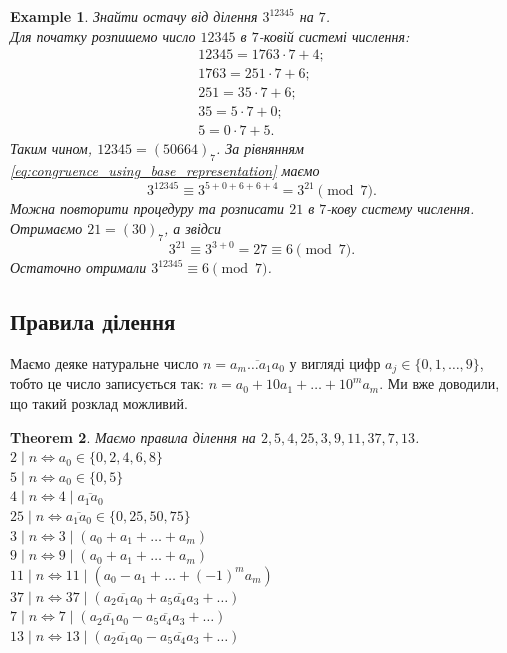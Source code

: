 \documentclass[a4paper, 10pt]{article}
\theoremstyle{theoremdd}
\newtheorem{theorem}{Theorem}[subsection]
\theoremstyle{theoremdd}
\theoremstyle{theoremdd}
\theoremstyle{theoremdd}
\newtheorem{example}[theorem]{Example}
\theoremstyle{theoremdd}
\theoremstyle{theoremdd}
\theoremstyle{theoremdd}
\theoremstyle{theoremdd}
\begin{document}
\begin{example}
Знайти остачу від ділення $3^{12345}$ на $7$.\\
Для початку розпишемо число $12345$ в $7$-ковій системі числення:
\begin{gather*}
12345 = 1763 \cdot 7 + 4;\\
1763 = 251 \cdot 7 + 6;\\
251 = 35 \cdot 7 + 6;\\
35 = 5 \cdot 7 + 0;\\
5 = 0 \cdot 7 + 5.
\end{gather*}
Таким чином, $12345 = (50664)_7$. За рівнянням \eqref{eq:congruence_using_base_representation} маємо
\[
3^{12345} \equiv 3^{5 + 0 + 6 + 6 + 4} = 3^{21} \pmod 7.
\]
Можна повторити процедуру та розписати $21$ в $7$-кову систему числення. Отримаємо $21 = (30)_7$, а звідси 
\[
3^{21} \equiv 3^{3+0} = 27 \equiv 6 \pmod 7.
\]
Остаточно отримали $3^{12345} \equiv 6 \pmod 7$.
\end{example}

\subsection{Правила ділення}
Маємо деяке натуральне число $n = \overline{a_m\dots a_1a_0}$ у вигляді цифр $a_j \in \{0,1,\dots,9\}$, тобто це число записується так: $n = a_0 + 10 a_1 + \dots + 10^m a_m$. Ми вже доводили, що такий розклад можливий.

\begin{theorem}
Маємо правила ділення на $2,5,4,25,3,9,11,37,7,13$.\\
$2 \mid n \iff a_0 \in \{0,2,4,6,8\}$\\
$5 \mid n \iff a_0 \in \{0,5\}$\\
$4 \mid n \iff 4 \mid \overline{a_1a_0}$\\
$25 \mid n \iff \overline{a_1a_0} \in \{0,25,50,75\}$\\
$3 \mid n \iff 3 \mid (a_0 + a_1 + \dots + a_m)$\\
$9 \mid n \iff 9 \mid (a_0 + a_1 + \dots + a_m)$\\
$11 \mid n \iff 11 \mid (a_0 - a_1 + \dots + (-1)^m a_m)$\\
$37 \mid n \iff 37 \mid (\overline{a_2a_1a_0} + \overline{a_5a_4a_3} + \dots)$\\
$7 \mid n \iff 7 \mid (\overline{a_2a_1a_0} - \overline{a_5a_4a_3} + \dots)$\\
$13 \mid n \iff 13 \mid (\overline{a_2a_1a_0} - \overline{a_5a_4a_3} + \dots)$
\end{theorem}
\end{document}
